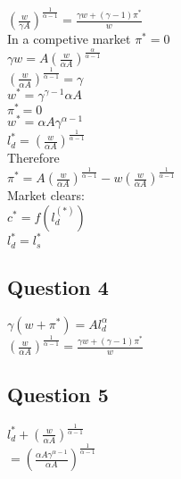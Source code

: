 \documentclass[11pt]{article}
\begin{document}
$\left(\frac{w}{\gamma A}\right)^{\frac{1}{\alpha-1}}=\frac{\gamma w+(\gamma-1)\pi^{*}}{w}$\\

In a competive market $\pi^{*}=0$\\

$\gamma w=A\left(  \frac{w}{\alpha A} \right)^{\frac{\alpha}{\alpha-1}}$\\

$\left(  \frac{w}{\alpha A} \right)^{\frac{1}{\alpha-1}}=\gamma$\\

$w^{*}=\gamma^{\gamma-1}\alpha A$\\

$\pi^{*}=0$\\

$w^{*}=\alpha A \gamma^{\alpha-1}$\\

$l_{d}^{*}=\left(  \frac{w}{\alpha A} \right)^{\frac{1}{\alpha-1}}$\\

Therefore\\

$\pi^{*}=A\left(  \frac{w}{\alpha A} \right)^{\frac{1}{\alpha-1}}-w\left(  \frac{w}{\alpha A} \right)^{\frac{1}{\alpha-1}}$\\

Market clears:\\
$c^{*}=f(l_{d}^(*))$\\

$l_{d}^{*}=l_{s}^{*}$\\

\subsection{Question 4}

$\gamma(w+\pi^{*})=Al_{d}^{\alpha}$\\

$\left(  \frac{w}{\alpha A} \right)^{\frac{1}{\alpha-1}}=\frac{\gamma w +(\gamma-1)\pi^{*}}{w}$\\


\subsection{Question 5}
$l_{d}^{*}+\left(  \frac{w}{\alpha A} \right)^{\frac{1}{\alpha-1}}$\\


$=\left(  \frac{\alpha A \gamma^{\alpha-1}}{\alpha A} \right)^{\frac{1}{\alpha-1}}$\\
\end{document}
